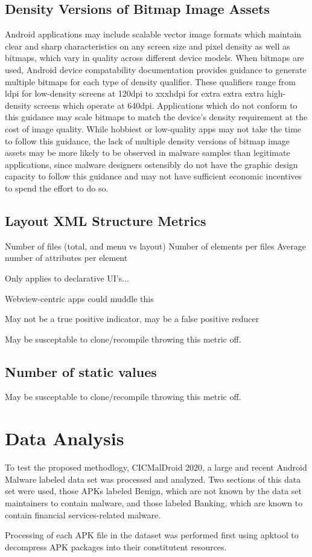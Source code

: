 \documentclass[preprint,1p]{elsarticle}
\begin{document}
\subsection{Density Versions of Bitmap Image Assets}
Android applications may include scalable vector image formats which maintain
clear and sharp characteristics on any screen size and pixel density as well as bitmaps, which vary in quality across different device models.  When bitmaps
are used, Android device compatability documentation provides guidance to generate multiple bitmaps for each type of density qualifier.%
These qualifiers range from ldpi for low-density screens at
120dpi to xxxhdpi for extra extra extra high-density screens which operate at 640dpi.  Applications which do not conform to this guidance may scale bitmaps to match the device's density requirement at the cost of image quality.  While hobbiest or low-quality apps may not take the time to follow this guidance, the lack of multiple density versions of bitmap image assets may be more likely to be observed in malware samples than legitimate applications, since malware designers ostensibly do not have the graphic design capacity to follow this guidance and may not have sufficient economic incentives to spend the effort to do so.

\subsection{Layout XML Structure Metrics}
Number of files (total, and menu vs layout)
Number of elements per files
Average number of attributes per element

Only applies to declarative UI's... 

Webview-centric apps could muddle this

May not be a true positive indicator, may be a false positive reducer

May be susceptable to clone/recompile throwing this metric off.

\subsection{Number of static values}


May be susceptable to clone/recompile throwing this metric off.

\section{Data Analysis}
To test the proposed methodlogy, CICMalDroid 2020\cite{9251198}, a large
and recent Android Malware labeled data set was processed and analyzed.  Two
sections of this data set were used, those APKs labeled Benign, which are not
known by the data set maintainers to contain malware, and those labeled
Banking, which are known to contain financial services-related malware.

Processing of each APK file in the dataset was performed first using
apktool\cite{apktool} to decompress APK packages into their constitutent
resources.




 

\end{document}
